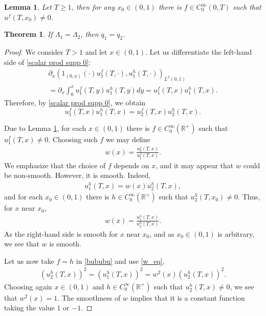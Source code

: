 \documentclass[10pt,a4paper]{amsart}
\newtheorem{lemma}{Lemma}
\newtheorem{theorem}{Theorem}
\newcommand{\HOX}[1]{\todo[noline,color=white,size=\footnotesize]{#1}}
\def\R{\mathbb R}
\begin{document}
\begin{lemma}\label{lem_nonvanishing}
	Let $T\geq 1$, then for any $x_0\in (0,1)$ there is $f\in C_0^\infty(0,T)$ such that $u^f(T,x_0) \neq 0$. 
\end{lemma}

\begin{theorem}\label{th_1d_main}
	If $\Lambda_1=\Lambda_2$, then $q_1=q_2$.
\end{theorem}

\begin{proof}
We consider $T > 1$ and let $x\in (0,1)$. Let us differentiate the left-hand side of \eqref{scalar prod supp 0}:
\begin{multline*}
	\partial_x 	\left(1_{(0,x)}(\cdot)u_1^f (T, \cdot), u_1^h (T, \cdot)\right)_{L^2(0,1)} \\
	= \partial_x\int_{0}^{x} u_1^f (T, y) u_1^h (T, y) dy = u_1^f (T, x) u_1^h (T, x).
\end{multline*}
Therefore, by \eqref{scalar prod supp 0}, we obtain
\begin{equation}\label{bububu}
	u_1^f (T, x) u_1^h (T, x) = u_2^f (T, x) u_2^h (T, x).
\end{equation}

Due to Lemma \ref{lem_nonvanishing},
for each $x \in (0,1)$ there is $f \in C_0^\infty(\R^+)$ such that 
$u_1^f(T,x) \ne 0$. Choosing such $f$ we may define
	\begin{align*}
w(x) = \frac{u_2^f (T, x)}{u_1^f (T, x)}.
	\end{align*}
We emphasize that the choice of $f$ depends on $x$, and it may appear that $w$ could be non-smooth. However, it is smooth. Indeed, 
	\begin{align}\label{w_eq}
u_1^h (T, x) = w(x) u_2^h (T, x),
	\end{align}
and for each $x_0 \in (0,1)$ there is $h \in C_0^\infty(\R^+)$ such that 
$u_2^h(T,x_0) \ne 0$. Thus, for $x$ near $x_0$,
	\begin{align*}
w(x) = \frac{u_1^h (T, x)}{u_2^h (T, x)}.
	\end{align*}
As the right-hand side is smooth for $x$ near $x_0$, and as $x_0 \in (0,1)$ is arbitrary, we see that $w$ is smooth. 

Let us now take $f = h$ in \eqref{bububu} and use \eqref{w_eq},
	\begin{align*}
(u_2^h(T,x))^2 = (u_1^h(T,x))^2 = w^2(x) (u_2^h(T,x))^2.
	\end{align*} 
Choosing again $x \in (0,1)$ and $h \in C_0^\infty(\R^+)$ such that 
$u_2^h(T,x) \ne 0$, we see that $w^2(x) = 1$.
The smoothness of $w$ implies that it is a constant function
taking the value $1$ or $-1$. 


\end{proof}
\end{document}
